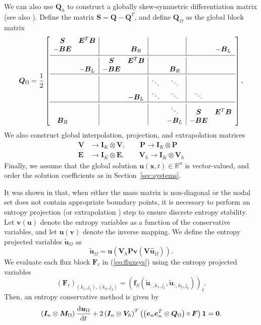\documentclass{article}
\renewcommand{\hat}{\widehat}
\renewcommand{\tilde}{\widetilde}
\newcommand{\td}[2]{\frac{{\rm d}#1}{{\rm d}{ {#2}}}}
\newcommand{\pd}[2]{\frac{\partial#1}{\partial#2}}
\newcommand{\LRp}[1]{\left( #1 \right)}
\newcommand{\LRs}[1]{\left[ #1 \right]}
\newcommand{\LRl}[1]{\left. #1 \right|}
\newcommand{\eq}[1]{\begin{align*}#1\end{align*}}
\begin{document}
We can also use $\bm{Q}_h$ to construct a globally skew-symmetric differentiation matrix (see also \cite{chan2018efficient}).  Define the matrix $\bm{S} = \bm{Q}-\bm{Q}^T$, and define $\bm{Q}_{\Omega}$ as the global block matrix
\[
\bm{Q}_{\Omega} = \frac{1}{2}\LRs{\begin{array}{cc|cc|cc|cc}
\bm{S} &  \bm{E}^T\bm{B} & &&& && \\
 - \bm{B}\bm{E} &  & & \bm{B}_R && && -\bm{B}_L\\ [.2em]
 \hline\\[-1.0em]
&& \bm{S} &  \bm{E}^T\bm{B}&&&& \\
& -\bm{B}_L &  - \bm{B}\bm{E} &&& \bm{B}_R&&\\
 \hline\\[-1.0em]
&&&& \ddots & \ddots&  \\
&&&   -\bm{B}_L & \ddots&\ddots&   \ddots&\\
 \hline\\[-1.0em]
&&&&&\ddots& \bm{S} &  \bm{E}^T\bm{B} \\
\bm{B}_R &&& &&-\bm{B}_L &  - \bm{B}\bm{E} &\\
\end{array}},
\]
We also construct global interpolation, projection, and extrapolation matrices
\eq{
\bm{V} &\longrightarrow \bm{I}_K \otimes \bm{V}, \qquad \bm{P} \longrightarrow \bm{I}_K \otimes \bm{P} \\ 
\bm{E} &\longrightarrow \bm{I}_K \otimes \bm{E}, \qquad \bm{V}_h \longrightarrow \bm{I}_K \otimes \bm{V}_h
}
Finally, we assume that the global solution $\bm{u}(\bm{x},t) \in \mathbb{R}^n$ is vector-valued, and order the solution coefficients as in Section~\ref{sec:systems}.  

It was shown in \cite{parsani2016entropy, chan2017discretely} that, when either the mass matrix is non-diagonal or the nodal set does not contain appropriate boundary points, it is necessary to perform an entropy projection (or extrapolation \cite{chenreview}) step to ensure discrete entropy stability.  Let $\bm{v}(\bm{u})$ denote the entropy variables as a function of the conservative variables, and let $\bm{u}(\bm{v})$ denote the inverse mapping.  We define the entropy projected variables $\tilde{\bm{u}}_{\Omega}$ as
\[
\tilde{\bm{u}}_{\Omega} = \bm{u}\LRp{\bm{V}_h\bm{P}\bm{v}\LRp{\bm{V}\hat{\bm{u}}_{\Omega}}}.
\]
We evaluate each flux block $\bm{F}_{\ell}$ in (\ref{eq:fluxsys}) using the entropy projected variables
\[
\LRp{\bm{F}_\ell}_{(k_1, j_1),(k_2,j_2)} = \LRp{\bm{f}_{S}\LRp{\tilde{\bm{u}}_{:, k_1,j_1},\tilde{\bm{u}}_{:, k_2,j_2}}}_{\ell}.
\]
Then, an entropy conservative method is given by 
\[
\LRp{\bm{I}_n\otimes \bm{M}_{\Omega}}\td{\bm{u}_{\Omega}}{t} + 2\LRp{\bm{I}_n\otimes \bm{V}_h}^T\LRp{ \LRp{\bm{e}_n\bm{e}_n^T\otimes \bm{Q}_{\Omega} } \circ \bm{F}}\bm{1} = \bm{0}.
\]
\end{document}
